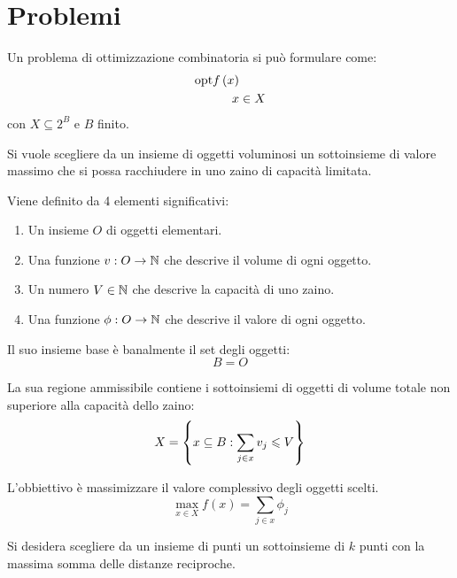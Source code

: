 \documentclass[\main/main.tex]{subfiles}
\begin{document}
\chapter{Problemi}
\begin{multicols}{2}
    \begin{problem}
        Un problema di ottimizzazione combinatoria si può formulare come:
        \begin{align*}
            \text{opt} f\left(x\right)&\\
            x &\in X
        \end{align*}
        con \(X \subseteq 2^B\) e \(B\) finito.
    \end{problem}
    \begin{problem}
        Si vuole scegliere da un insieme di oggetti voluminosi un sottoinsieme di valore massimo che si possa racchiudere in uno zaino di capacità limitata.
        
        Viene definito da 4 elementi significativi: 
        \begin{enumerate}
            \item Un insieme \(O\) di oggetti elementari.
            \item Una funzione \(v: O \rightarrow \mathbb{N} \) che descrive il volume di ogni oggetto.
            \item Un numero \(V \in \mathbb{N} \) che descrive la capacità di uno zaino.
            \item Una funzione \(\phi: O \rightarrow \mathbb{N}\) che descrive il valore di ogni oggetto.
        \end{enumerate}
    \end{problem}
    \begin{definition}
        Il suo insieme base è banalmente il set degli oggetti:
        \[
            B = O
        \]
    \end{definition}
    \begin{definition}
        La sua regione ammissibile contiene i sottoinsiemi di oggetti di volume totale non superiore alla capacità dello zaino:
        \[
            X = \left\{x \subseteq B: \sum_{j\in x} v_{j} \leqslant V\right\}
        \]
    \end{definition}
    \begin{definition}
        L'obbiettivo è massimizzare il valore complessivo degli oggetti scelti.
        \[
            \max_{x \in X} f(x) = \sum_{j \in x} \phi_{j}
        \]
    \end{definition}
    \begin{problem}
        Si desidera scegliere da un insieme di punti un sottoinsieme di \(k\) punti con la massima somma delle distanze reciproche. 
        

\end{problem}
\end{multicols}
\end{document}
